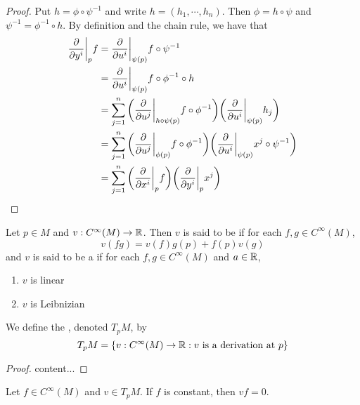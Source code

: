 \documentclass{book}
\begin{document}
	\begin{proof}
		Put $h = \phi \circ \psi^{-1}$ and write $h = (h_1, \cdots, h_n)$. Then $\phi = h \circ \psi$ and $\psi^{-1} = \phi^{-1} \circ h$. By definition and the chain rule, we have that 
		\begin{align*}
		\frac{\partial}{\partial y^i} \bigg|_p f 
			&= \frac{\partial}{\partial u^i} \bigg|_{\psi(p)} f \circ \psi^{-1} \\
			&= \frac{\partial}{\partial u^i} \bigg|_{\psi(p)} f \circ \phi^{-1} \circ h \\
			&= \sum_{j=1}^n \bigg(\frac{\partial}{\partial u^j} \bigg|_{h \circ \psi (p)} f \circ \phi^{-1} \bigg)  \bigg( \frac{\partial}{\partial u^i} \bigg|_{\psi(p)} h_j \bigg) \\
			&= \sum_{j=1}^n \bigg(\frac{\partial}{\partial u^j} \bigg|_{\phi (p)} f \circ \phi^{-1}  \bigg) \bigg( \frac{\partial}{\partial u^i} \bigg|_{\psi(p)} x^j \circ \psi^{-1} \bigg) \\
			&= \sum_{j=1}^n \bigg( \frac{\partial}{\partial x^i} \bigg|_p f \bigg)  \bigg(   \frac{\partial}{\partial y^i} \bigg|_p x^j  \bigg)\\
		\end{align*}
	\end{proof}

	\begin{defn}
		Let $p \in M$ and $v: C^{\infty}(M) \rightarrow \mathbb{R}$. Then $v$ is said to be  if for each $f,g \in  C^{\infty}(M)$, $$v(fg) = v(f)g(p) + f(p)v(g)$$ and $v$ is said to be a  if for each $f, g \in C^{\infty}(M)$ and $a \in \mathbb{R}$,
		\begin{enumerate}
			\item $v$ is linear 
			\item $v$ is Leibnizian
		\end{enumerate}
		We define the , denoted $T_pM$, by $$T_pM = \{ v: C^{\infty}(M) \rightarrow \mathbb{R}: v \text{ is a derivation at }p\}$$
	\end{defn}

	\begin{ex}
	\end{ex}

	\begin{proof}
		content...
	\end{proof}

	\begin{ex}
		Let $f \in C^{\infty}(M)$ and $v \in T_pM$. If $f$ is constant, then $vf = 0$.
	\end{ex}
\end{document}
